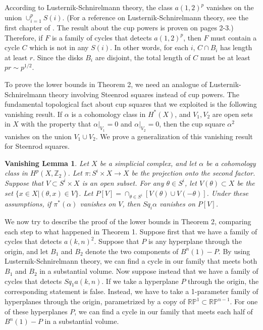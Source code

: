 \documentclass{amsart}
\newtheorem*{Theorem 1}{Theorem 1}
\newtheorem*{Theorem 2}{Theorem 2}
\newtheorem*{Theorem 1A}{Theorem 1A}
\newtheorem*{Theorem 2A}{Theorem 2A}
\newtheorem*{vanishing lemma}{Vanishing Lemma}
\numberwithin{equation}{section}
\begin{document}
According to Lusternik-Schnirelmann theory, the class $a(1,2)^p$
vanishes on the union $\cup_{i=1}^p S(i)$.  (For a reference on
Lusternik-Schnirelmann theory, see the first chapter of \cite{LS}.  
The result about the cup powers is proven on pages 2-3.)
Therefore, if $F$ is a
family of cycles that detects $a(1,2)^p$, then $F$ must contain a
cycle $C$ which is not in any $S(i)$.  In other words, for each
$i$, $C \cap B_i$ has length at least $r$.  Since the disks $B_i$
are disjoint, the total length of $C$ must be at least $p r \sim
p^{1/2}$.

To prove the lower bounds in Theorem 2, we need an analogue of
Lusternik-Schnirelmann theory involving Steenrod squares instead
of cup powers.  The fundamental topological fact about cup squares
that we exploited is the following
vanishing result.  If $\alpha$ is a cohomology
class in $H^*(X)$, and $V_1, V_2$ are open sets in $X$ with the
property that $\alpha |_{V_1} = 0$ and $\alpha |_{V_2} = 0$,
then the cup square $\alpha^2$
vanishes on the union $V_1 \cup V_2$.  We prove a generalization of
this vanishing result for Steenrod squares.

\begin{vanishing lemma} Let $X$ be a simplicial complex, 
and let $\alpha$ be a cohomology class in $H^p(X, \mathbb{Z}_2)$. 
Let $\pi: S^i \times X \rightarrow X$ be the projection onto the
second factor.  Suppose that $V \subset S^i \times X$ is
an open subset.  For any $\theta \in S^i$, let $V(\theta) 
\subset X$ be the set $\{ x \in X | (\theta, x) \in
V \}$. Let $P[V] = \cap_{\theta \in S^i} [V(\theta) \cup V(-
\theta)]$.  Under these assumptions, if $\pi^*(\alpha)$ vanishes
on $V$, then $Sq_i \alpha$ vanishes on $P[V]$.
\end{vanishing lemma}

We now try to describe the proof of the lower bounds in Theorem 2,
comparing each step to what happened in Theorem 1.  Suppose first that
we have a family of cycles that detects $a(k,n)^2$.  Suppose that $P$
is any hyperplane through the origin, and let $B_1$ and $B_2$ denote
the two components of $B^n(1) - P$.  By using Lusternik-Schnirelmann
theory, we can find a cycle in our
family that meets both $B_1$ and $B_2$ in a substantial volume.  
Now suppose instead
that we have a family of cycles that detects $Sq_1 a(k,n)$.  If we take
a hyperplane $P$ through the origin, the corresponding statement is
false.  Instead, we have to take a 1-parameter family of hyperplanes through the origin,
parametrized by a copy of $\mathbb{RP}^1 \subset \mathbb{RP}^{n-1}$.  For
one of these hyperplanes $P$, we can find a cycle in our family that meets
each half of $B^n(1) - P$ in a substantial volume.
\end{document}
